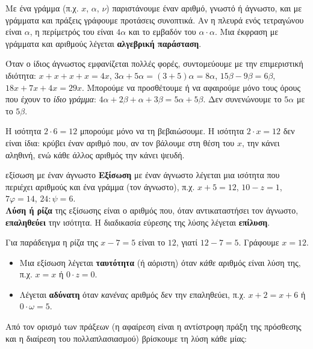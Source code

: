

Με ένα γράμμα (π.χ. $x$, $\alpha$, $\nu$) παριστάνουμε έναν αριθμό, γνωστό ή άγνωστο, και με γράμματα και πράξεις γράφουμε προτάσεις συνοπτικά. Αν η πλευρά ενός τετραγώνου είναι $\alpha$, η περίμετρός του είναι $4\alpha$ και το εμβαδόν του $\alpha\cdot\alpha$. Μια έκφραση με γράμματα και αριθμούς λέγεται \textbf{αλγεβρική παράσταση}.

Όταν ο ίδιος άγνωστος εμφανίζεται πολλές φορές, συντομεύουμε με την επιμεριστική ιδιότητα: $x+x+x+x=4x$, $3\alpha+5\alpha=(3+5)\alpha=8\alpha$, $15\beta-9\beta=6\beta$, $18x+7x+4x=29x$. Μπορούμε να προσθέτουμε ή να αφαιρούμε μόνο τους όρους που έχουν το \emph{ίδιο γράμμα}: $4\alpha+2\beta+\alpha+3\beta=5\alpha+5\beta$. Δεν συνενώνουμε το $5\alpha$ με το $5\beta$.


Η ισότητα $2\cdot6=12$ μπορούμε μόνο να τη βεβαιώσουμε. Η ισότητα $2\cdot x=12$ δεν είναι ίδια: κρύβει έναν αριθμό που, αν τον βάλουμε στη θέση του $x$, την κάνει αληθινή, ενώ κάθε άλλος αριθμός την κάνει ψευδή.

\begin{orismos}{εξίσωση με έναν άγνωστο}
\textbf{Εξίσωση} με έναν άγνωστο λέγεται μια ισότητα που περιέχει αριθμούς και ένα γράμμα (τον άγνωστο), π.χ. $x+5=12$, $10-z=1$, $7\varphi=14$, $24:\psi=6$.\\
\textbf{Λύση ή ρίζα} της εξίσωσης είναι ο αριθμός που, όταν αντικαταστήσει τον άγνωστο, \textbf{επαληθεύει} την ισότητα. Η διαδικασία εύρεσης της λύσης λέγεται \textbf{επίλυση}.
\end{orismos}

Για παράδειγμα η ρίζα της $x-7=5$ είναι το $12$, γιατί $12-7=5$. Γράφουμε $x=12$.


\begin{itemize}[leftmargin=1.2em,itemsep=0.3ex,topsep=2pt]
\item Μια εξίσωση λέγεται \textbf{ταυτότητα} (ή αόριστη) όταν \emph{κάθε} αριθμός είναι λύση της, π.χ. $x=x$ ή $0\cdot z=0$.
\item Λέγεται \textbf{αδύνατη} όταν \emph{κανένας} αριθμός δεν την επαληθεύει, π.χ. $x+2=x+6$ ή $0\cdot\omega=5$.
\end{itemize}


Από τον ορισμό των πράξεων (η αφαίρεση είναι η αντίστροφη πράξη της πρόσθεσης και η διαίρεση του πολλαπλασιασμού) βρίσκουμε τη λύση κάθε μίας:

